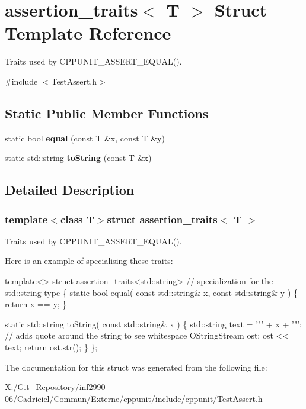 \hypertarget{structassertion__traits}{\section{assertion\-\_\-traits$<$ T $>$ Struct Template Reference}
\label{structassertion__traits}
}


Traits used by C\-P\-P\-U\-N\-I\-T\-\_\-\-A\-S\-S\-E\-R\-T\-\_\-\-E\-Q\-U\-A\-L().  




{\ttfamily \#include $<$Test\-Assert.\-h$>$}

\subsection*{Static Public Member Functions}
\begin{DoxyCompactItemize}
\item 
\hypertarget{structassertion__traits_a287c07a4e171256a0128201c7e4c4228}{static bool {\bfseries equal} (const T \&x, const T \&y)}\label{structassertion__traits_a287c07a4e171256a0128201c7e4c4228}

\item 
\hypertarget{structassertion__traits_a1c96296fb44902b4f22d99b9c3cc7749}{static std\-::string {\bfseries to\-String} (const T \&x)}\label{structassertion__traits_a1c96296fb44902b4f22d99b9c3cc7749}

\end{DoxyCompactItemize}


\subsection{Detailed Description}
\subsubsection*{template$<$class T$>$struct assertion\-\_\-traits$<$ T $>$}

Traits used by C\-P\-P\-U\-N\-I\-T\-\_\-\-A\-S\-S\-E\-R\-T\-\_\-\-E\-Q\-U\-A\-L(). 

Here is an example of specialising these traits\-:


\begin{DoxyCode}
\textcolor{keyword}{template}<>
\textcolor{keyword}{struct }\hyperlink{structassertion__traits}{assertion\_traits}<std::string>   \textcolor{comment}{// specialization for the std::string type}
\{
  \textcolor{keyword}{static} \textcolor{keywordtype}{bool} equal( \textcolor{keyword}{const} std::string& x, \textcolor{keyword}{const} std::string& y )
  \{
    \textcolor{keywordflow}{return} x == y;
  \}

  \textcolor{keyword}{static} std::string toString( \textcolor{keyword}{const} std::string& x )
  \{
    std::string text = \textcolor{charliteral}{'"'} + x + \textcolor{charliteral}{'"'};    \textcolor{comment}{// adds quote around the string to see whitespace}
    OStringStream ost;
    ost << text;
    \textcolor{keywordflow}{return} ost.str();
  \}
\};
\end{DoxyCode}
 

The documentation for this struct was generated from the following file\-:\begin{DoxyCompactItemize}
\item 
X\-:/\-Git\-\_\-\-Repository/inf2990-\/06/\-Cadriciel/\-Commun/\-Externe/cppunit/include/cppunit/Test\-Assert.\-h\end{DoxyCompactItemize}
